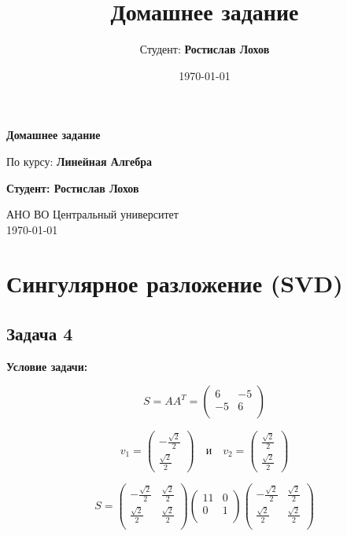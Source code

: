 \documentclass[a4paper,12pt]{article}
\title{Домашнее задание}
\author{Студент: \textbf{Ростислав Лохов}}
\date{\today}
\begin{document}
\begin{titlepage}
    \centering
    \vspace*{1cm}

    \Huge
    \textbf{Домашнее задание}

    \vspace{0.5cm}
    \LARGE
    По курсу: \textbf{Линейная Алгебра}

    \vspace{1.5cm}

    \textbf{Студент: Ростислав Лохов}

    \vfill

    \Large
    АНО ВО Центральный университет\\
    \vspace{0.3cm}
    \today

\end{titlepage}

\tableofcontents
\newpage

\section{Сингулярное разложение (SVD)}

\subsection{Задача 4}
\textbf{Условие задачи:}

\[
S = AA^T = \begin{pmatrix}
    6 & -5 \\
    -5 & 6 \\
\end{pmatrix}
\]

\[
v_1 = \begin{pmatrix}
    -\frac{\sqrt{2}}{2} \\ \frac{\sqrt{2}}{2}
\end{pmatrix} \quad \text{и} \quad v_2 = \begin{pmatrix}
\frac{\sqrt{2}}{2} \\ \frac{\sqrt{2}}{2}
\end{pmatrix}
\]

\[
S = \begin{pmatrix}
    -\frac{\sqrt{2}}{2} & \frac{\sqrt{2}}{2} \\
    \frac{\sqrt{2}}{2} & \frac{\sqrt{2}}{2} \\
\end{pmatrix} \begin{pmatrix}
    11 & 0 \\
    0 & 1 \\
\end{pmatrix} \begin{pmatrix}
    -\frac{\sqrt{2}}{2} & \frac{\sqrt{2}}{2} \\
    \frac{\sqrt{2}}{2} & \frac{\sqrt{2}}{2} \\
\end{pmatrix}
\]
\end{document}
